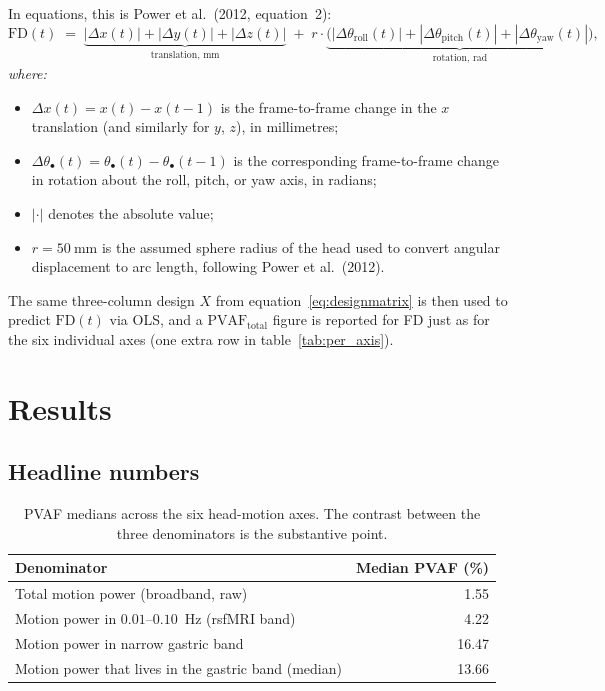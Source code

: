 \documentclass[11pt]{article}
\newcommand{\PVAF}{\mathrm{PVAF}}
\begin{document}
In equations, this is Power et al.\ (2012, equation~2):
\begin{equation}
\mathrm{FD}(t) \;=\;
\underbrace{|\Delta x(t)| + |\Delta y(t)| + |\Delta z(t)|}_{\text{translation, mm}}
\;+\; r\cdot
\underbrace{\bigl(|\Delta\theta_{\text{roll}}(t)| + |\Delta\theta_{\text{pitch}}(t)| + |\Delta\theta_{\text{yaw}}(t)|\bigr)}_{\text{rotation, rad}},
\end{equation}
\textit{where:}
\begin{itemize}\setlength{\itemsep}{1pt}
\item $\Delta x(t) = x(t) - x(t-1)$ is the frame-to-frame change in
the $x$ translation (and similarly for $y$, $z$), in millimetres;
\item $\Delta\theta_{\bullet}(t) = \theta_{\bullet}(t) -
\theta_{\bullet}(t-1)$ is the corresponding frame-to-frame change in
rotation about the roll, pitch, or yaw axis, in radians;
\item $|\cdot|$ denotes the absolute value;
\item $r = \SI{50}{\milli\meter}$ is the assumed sphere radius of the
head used to convert angular displacement to arc length, following
Power et al.\ (2012).
\end{itemize}
The same three-column design $X$ from
equation~\ref{eq:designmatrix} is then used to predict $\mathrm{FD}(t)$
via OLS, and a $\PVAF_{\text{total}}$ figure is reported for FD just as
for the six individual axes (one extra row in
table~\ref{tab:per_axis}).

\section{Results}

\subsection{Headline numbers}

\begin{table}[h!]
\centering
\caption{PVAF medians across the six head-motion axes. The contrast
between the three denominators is the substantive point.}
\label{tab:headline}
\begin{tabular}{lr}
\toprule
Denominator & Median PVAF (\%) \\ \midrule
Total motion power (broadband, raw)               & 1.55 \\
Motion power in $0.01$--$0.10$~Hz (rsfMRI band)   & 4.22 \\
Motion power in narrow gastric band               & 16.47 \\
\midrule
Motion power that lives in the gastric band (median) & 13.66 \\
\bottomrule
\end{tabular}
\end{table}
\end{document}
